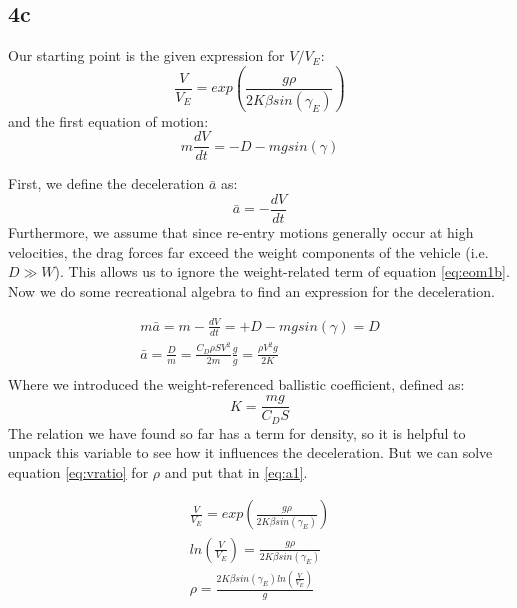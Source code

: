 \subsection{4c}
Our starting point is the given expression for $V/V_E$:
\begin{equation}\label{eq:vratio}
    \frac{V}{V_E} = exp \left( \frac{g \rho}{2 K \beta sin(\gamma_E)} \right)
\end{equation}
and the first equation of motion:
\begin{equation}\label{eq:eom1b}
    m \frac{dV}{dt} = -D - m g sin(\gamma)
\end{equation}

First, we define the deceleration $\bar{a}$ as:
\begin{equation}
    \bar{a} = - \frac{dV}{dt}
\end{equation}
Furthermore, we assume that since re-entry motions generally occur at high velocities, the drag forces far exceed the weight components of the vehicle (i.e. $D \gg W$). This allows us to ignore the weight-related term of equation \ref{eq:eom1b}. Now we do some recreational algebra to find an expression for the deceleration.

\begin{equation} \label{eq:a1}
\begin{split}
    m \bar{a} = m -\frac{dV}{dt} = + D - m g sin(\gamma) = D\\
    \bar{a} = \frac{D}{m} = \frac{C_D \rho S V^2 }{2 m} \frac{g}{g} = \frac{\rho V^2 g}{2 K}\\
\end{split}
\end{equation}
Where we introduced the weight-referenced ballistic coefficient, defined as:
\begin{equation}
    K = \frac{m g}{C_D S}
\end{equation}
The relation we have found so far has a term for density, so it is helpful to unpack this variable to see how it influences the deceleration. But we can solve equation \ref{eq:vratio} for $\rho$ and put that in \ref{eq:a1}.

\begin{equation} \label{eq:densitystuff}
\begin{split}
    \frac{V}{V_E} = exp \left( \frac{g \rho}{2 K \beta sin(\gamma_E)} \right) \\
    ln \left( \frac{V}{V_E} \right) = \frac{g \rho}{2 K \beta sin(\gamma_E)} \\
    \rho = \frac{2 K \beta sin(\gamma_E) ln(\frac{V}{V_E})}{g} \\
\end{split}
\end{equation}

